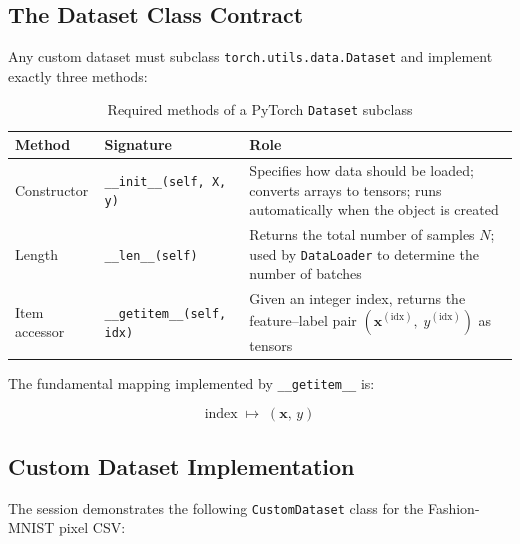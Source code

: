 \documentclass[12pt,a4paper]{article}
\begin{document}
\subsection{The Dataset Class Contract}
\label{subsec:dataset-contract}

Any custom dataset must subclass \texttt{torch.utils.data.Dataset} and
implement exactly three methods:

\begin{table}[htbp]
  \centering
  \caption{Required methods of a PyTorch \texttt{Dataset} subclass}
  \label{tab:dataset-methods}
  \begin{tabularx}{\linewidth}{llX}
    \toprule
    \textbf{Method} & \textbf{Signature} & \textbf{Role} \\
    \midrule
    Constructor & \texttt{\_\_init\_\_(self, X, y)} &
      Specifies how data should be loaded; converts arrays to tensors;
      runs automatically when the object is created \\
    Length & \texttt{\_\_len\_\_(self)} &
      Returns the total number of samples $N$; used by \texttt{DataLoader}
      to determine the number of batches \\
    Item accessor & \texttt{\_\_getitem\_\_(self, idx)} &
      Given an integer index, returns the feature--label pair
      $(\mathbf{x}^{(\text{idx})},\; y^{(\text{idx})})$ as tensors \\
    \bottomrule
  \end{tabularx}
\end{table}

The fundamental mapping implemented by \texttt{\_\_getitem\_\_} is:

\begin{equation}
  \text{index} \;\longmapsto\; (\mathbf{x},\, y)
  \label{eq:getitem}
\end{equation}

\subsection{Custom Dataset Implementation}
\label{subsec:custom-dataset}

The session demonstrates the following \texttt{CustomDataset} class for the
Fashion-MNIST pixel CSV:
\end{document}
